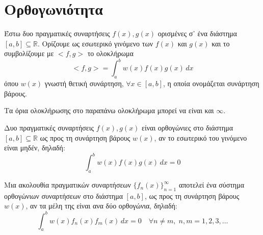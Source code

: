 









\chapter{Ορθογωνιότητα}

\begin{dfn}
    Έστω δυο πραγματικές συναρτήσεις $ f(x), g(x) $ ορισμένες σ᾽ ένα διάστημα 
    $ [a,b] \subseteq \mathbb{R} $. Ορίζουμε ως \textcolor{Col1}{εσωτερικό γινόμενο} 
    των $ f(x) $ και $ g(x) $ και το συμβολίζουμε με $ <f,g> $ το ολοκλήρωμα
    \[
        <f,g> = \int _{a}^{b} w(x) f(x)g(x) \,{dx} 
    \] 
    όπου $ w(x) $ γνωστή θετική συνάρτηση, $ \forall x \in [a,b] $, η οποία 
    ονομάζεται \textcolor{Col1}{συνάρτηση βάρους}.
\end{dfn}

\begin{rem}
    Τα όρια ολοκλήρωσης στο παραπάνω ολοκλήρωμα μπορεί να είναι και $ \infty $.
\end{rem}

\begin{dfn}
    Δυο πραγματικές συναρτήσεις $ f(x), g(x) $ είναι \textcolor{Col1}{ορθογώνιες} 
    στο διάστημα $ [a,b] \subseteq \mathbb{R} $ ως προς τη συνάρτηση βάρους $ w(x) $, 
    αν το εσωτερικό του γινόμενο είναι μηδέν, δηλαδή:
    \[
        \int _{a}^{b} w(x)f(x)g(x) \,{dx} = 0
    \] 
\end{dfn}

\begin{dfn}
    Μια ακολουθία πραγματικών συναρτήσεων $ \{ f_{n}(x) \}_{n=1}^{\infty} $ αποτελεί 
    ένα σύστημα ορθογώνιων συναρτήσεων στο διάστημα $ [a,b] $, ως προς τη 
    συνάρτηση βάρους $ w(x) $, αν τα μέλη της είναι ανα δύο ορθογώνια, δηλαδή:
    \[
        \int _{a}^{b} w(x) f_{n}(x)f_{m}(x) \,{dx} = 0 \quad \forall n \neq m, \; n,m = 
        1,2,3, \ldots
    \] 
\end{dfn}


